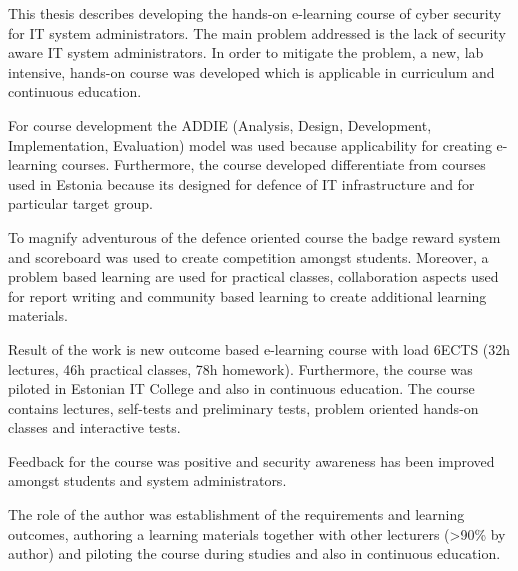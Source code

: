 This thesis describes developing the hands-on e-learning course of cyber security for IT system administrators. The main problem addressed is the lack of security aware IT system administrators.   In order to mitigate the problem, a new, lab intensive, hands-on course was developed which is applicable in curriculum and continuous education.

For course development the \gls{ADDIE} (Analysis, Design, Development, Implementation, Evaluation) model was used because applicability for creating e-learning courses. Furthermore, the course developed differentiate from courses used in Estonia because its designed for defence of IT infrastructure and for particular target group.

To magnify adventurous of the defence oriented course the badge reward system and scoreboard was used to create competition amongst students. Moreover, a problem based learning are used for practical classes, collaboration aspects used for report writing and community based learning to create additional learning materials.

Result of the work is new outcome based e-learning course with load 6ECTS (32h lectures, 46h practical classes, 78h homework). Furthermore, the course was piloted in Estonian IT College and also in continuous education. The course contains lectures, self-tests and preliminary tests, problem oriented hands-on classes and interactive tests.

Feedback for the course was positive and security awareness has been improved amongst students and system administrators. %

The role of the author was establishment of the requirements and learning outcomes, authoring a learning materials together with other lecturers (>90\% by author) and piloting the course during studies and also in continuous education. 
